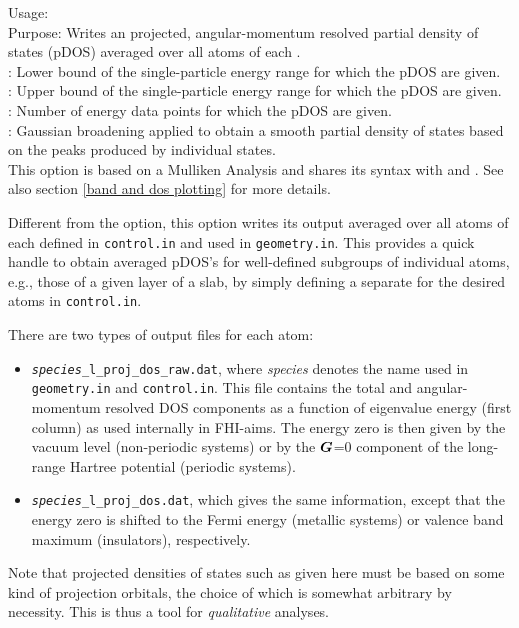 {
  Usage:    \\[1.0ex]
  Purpose: Writes an projected, angular-momentum resolved partial
    density of states (pDOS) averaged over all atoms of each
    . \\[1.0ex] 
   : Lower bound of the single-particle energy range
    for which the pDOS are given. \\
   : Upper bound of the single-particle energy range
    for which the pDOS are given. \\
   : Number of energy data points for which the
    pDOS are given. \\
   : Gaussian broadening applied to obtain a smooth
    partial density of states based on the peaks produced by
    individual states. \\
} 
This option is based on a Mulliken Analysis and shares its syntax with 
  and 
. See also section \ref{band
and dos plotting} for more details.

Different from the
 option, this option writes its
output averaged over all atoms of each  defined in
\texttt{control.in} and used in \texttt{geometry.in}. This provides a
quick handle to obtain averaged pDOS's for well-defined subgroups of
individual atoms, e.g., those of a given layer of a slab, by simply
defining a separate  for the desired atoms in
\texttt{control.in}. 

There are two types of output files for each atom:
\begin{itemize}
  \item \texttt{\emph{species}\_l\_proj\_dos\_raw.dat}, where \emph{species}
    denotes the  name used in \texttt{geometry.in} and
    \texttt{control.in}. This file 
    contains the total and angular-momentum resolved DOS components as a
    function of eigenvalue energy (first column) as used internally in
    FHI-aims. The energy zero is then given by the vacuum level (non-periodic
    systems) or by the $\mbox{\boldmath$G$}$=0 component of the long-range Hartree
    potential (periodic systems).
  \item \texttt{\emph{species}\_l\_proj\_dos.dat}, which gives the same
    information, except that the energy zero is shifted to the Fermi energy
    (metallic systems) or valence band maximum (insulators), respectively.
\end{itemize}
Note that projected densities of states such as given here must be
based on some kind of projection orbitals, the choice of which is
somewhat arbitrary by necessity. This is thus a tool for
\emph{qualitative} analyses.

